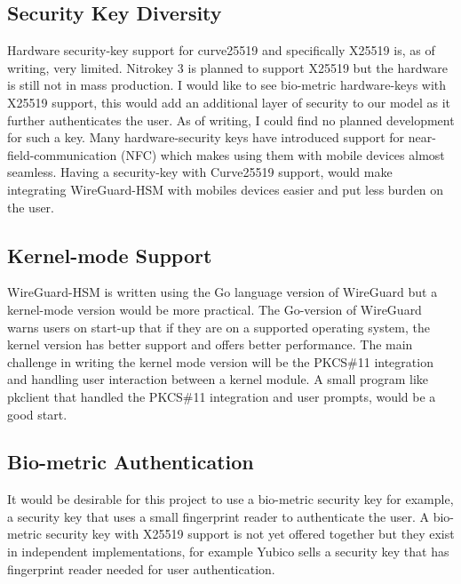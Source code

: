 \documentclass [11pt, proquest] {uwthesis}[2020/02/24]
\begin{document}
\subsection{Security Key Diversity}
Hardware security-key support for curve25519 and specifically X25519 is, as of writing, very limited. Nitrokey 3 is planned to support X25519 but the hardware is still not in mass production. I would like to see bio-metric hardware-keys with X25519 support, this would add an additional layer of security to our model as it further authenticates the user. As of writing, I could find no planned development for such a key. Many hardware-security keys have introduced support for near-field-communication (NFC) which makes using them with mobile devices almost seamless. Having a security-key with Curve25519 support, would make integrating WireGuard-HSM with mobiles devices easier and put less burden on the user. 

\subsection{Kernel-mode Support}
WireGuard-HSM is written using the Go language version of WireGuard but a kernel-mode version would be more practical. The Go-version of WireGuard warns users on start-up that if they are on a supported operating system, the kernel version has better support and offers better performance. The main challenge in writing the kernel mode version will be the PKCS\#11 integration and handling user interaction between a kernel module. A small program like pkclient that handled the PKCS\#11 integration and user prompts, would be a good start. 

\subsection{Bio-metric Authentication}
It would be desirable for this project to use a bio-metric security key for example, a security key that uses a small fingerprint reader to authenticate the user. A bio-metric security key with X25519 support is not yet offered together but they exist in independent implementations, for example Yubico sells a security key that has fingerprint reader needed for user authentication\cite{yubico_yubikey_2022}. 



\end{document}
